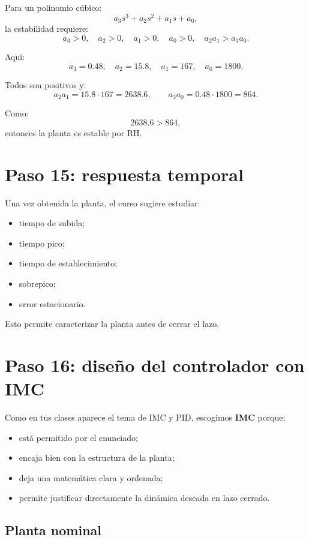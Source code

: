 \documentclass[11pt]{article}
\begin{document}
Para un polinomio c\'ubico:
\[
a_3s^3+a_2s^2+a_1s+a_0,
\]
la estabilidad requiere:
\[
a_3>0,\quad a_2>0,\quad a_1>0,\quad a_0>0,\quad a_2a_1>a_3a_0.
\]

Aqu\'i:
\[
a_3=0.48,\quad a_2=15.8,\quad a_1=167,\quad a_0=1800.
\]

Todos son positivos y:
\[
a_2a_1 = 15.8\cdot167 = 2638.6,
\qquad
a_3a_0 = 0.48\cdot1800 = 864.
\]

Como:
\[
2638.6 > 864,
\]
entonces la planta es estable por RH.

\section{Paso 15: respuesta temporal}

Una vez obtenida la planta, el curso sugiere estudiar:

\begin{itemize}[leftmargin=1.2cm]
\item tiempo de subida;
\item tiempo pico;
\item tiempo de establecimiento;
\item sobrepico;
\item error estacionario.
\end{itemize}

Esto permite caracterizar la planta antes de cerrar el lazo.

\section{Paso 16: dise\~no del controlador con IMC}

Como en tus clases aparece el tema de IMC y PID, escogimos \textbf{IMC} porque:

\begin{itemize}[leftmargin=1.2cm]
\item est\'a permitido por el enunciado;
\item encaja bien con la estructura de la planta;
\item deja una matem\'atica clara y ordenada;
\item permite justificar directamente la din\'amica deseada en lazo cerrado.
\end{itemize}

\subsection{Planta nominal}
\end{document}
